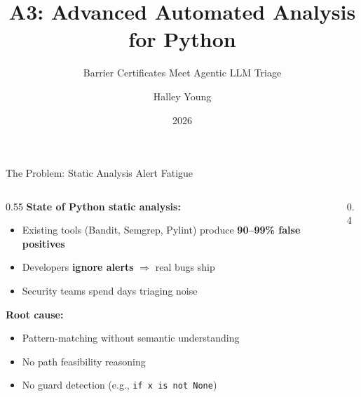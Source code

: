 \documentclass[aspectratio=169]{beamer}
\title{\textbf{A3: Advanced Automated Analysis for Python}}
\subtitle{Barrier Certificates Meet Agentic LLM Triage}
\author{Halley Young}
\institute{RiSE Group --- Microsoft Research}
\date{2026}
\begin{document}
\begin{frame}
\titlepage
\end{frame}

\begin{frame}{The Problem: Static Analysis Alert Fatigue}

\begin{columns}[T]
\begin{column}{0.55\textwidth}
\textbf{State of Python static analysis:}
\begin{itemize}
  \item Existing tools (Bandit, Semgrep, Pylint) produce \textbf{90--99\% false positives}
  \item Developers \textbf{ignore alerts} $\Rightarrow$ real bugs ship
  \item Security teams spend days triaging noise
\end{itemize}

\vspace{1em}
\textbf{Root cause:}
\begin{itemize}
  \item Pattern-matching without semantic understanding
  \item No path feasibility reasoning
  \item No guard detection (e.g., \texttt{if x is not None})
\end{itemize}
\end{column}
\begin{column}{0.4\textwidth}
\centering
{}
\end{column}
\end{columns}

\end{frame}
\end{document}
